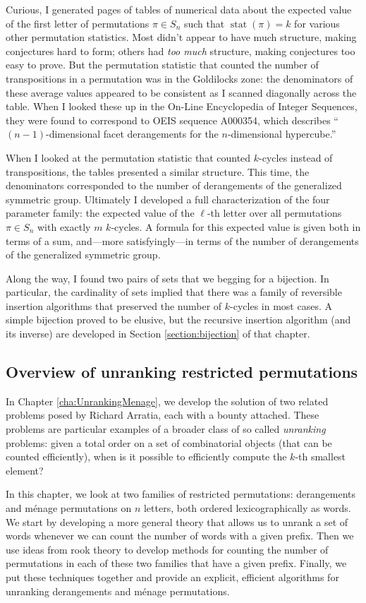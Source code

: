 Curious, I generated pages of tables of numerical data about the expected value
of the first letter of permutations $\pi \in S_n$ such that
$\operatorname{stat}(\pi) = k$ for various other permutation statistics.
Most didn't appear to have much structure, making conjectures hard to form;
others had \textit{too much} structure, making conjectures too easy to
prove.
But the permutation statistic that counted the number of transpositions in a
permutation was in the Goldilocks zone: the denominators of these average
values appeared to be consistent as I scanned diagonally across the table.
When I looked these up in the On-Line Encyclopedia of Integer Sequences,
they were found to correspond to OEIS sequence A000354, which describes
``$(n-1)$-dimensional facet derangements for the $n$-dimensional hypercube.''

When I looked at the permutation statistic that counted $k$-cycles instead of
transpositions, the tables presented a similar structure. This time, the
denominators corresponded to the number of derangements of the generalized
symmetric group. Ultimately I developed a full characterization of the four
parameter family: the expected value of the $\ell$-th letter over all
permutations $\pi \in S_n$ with exactly $m$ $k$-cycles.
A formula for this expected value is given both in terms of a sum,
and---more satisfyingly---in terms of the number of derangements of the
 generalized symmetric group.

Along the way, I found two pairs of sets that we begging for a bijection.
In particular, the cardinality of sets implied that there was a
family of reversible insertion algorithms that preserved the number of
$k$-cycles in most cases. A simple bijection proved to be elusive, but
the recursive insertion algorithm (and its inverse) are developed in
Section \ref{section:bijection} of that chapter.

\subsection{Overview of unranking restricted permutations}
In Chapter \ref{cha:UnrankingMenage}, we develop the solution of two related
problems posed by Richard Arratia, each with a bounty attached.
These problems are particular examples of a broader class of so called
\textit{unranking} problems:
given a total order on a set of combinatorial objects (that can be counted
efficiently), when is it possible to efficiently compute the $k$-th smallest
element?

In this chapter, we look at two families of restricted permutations:
derangements and m\'enage permutations on $n$ letters, both ordered
lexicographically as words.
We start by developing a more general theory that allows us to unrank a set
of words whenever we can count the number of words with a given prefix.
Then we use ideas from rook theory to develop methods for counting the number
of permutations in each of these two families that have a given prefix.
Finally, we put these techniques together and provide an explicit, efficient
algorithms for unranking derangements and m\'enage permutations.

